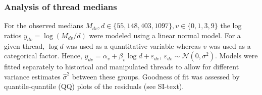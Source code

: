 \documentclass[9pt,a4paper,twocolumn,lineno]{article}
\begin{document}
\subsubsection*{Analysis of thread medians} For the observed medians $M_{dv}, d\in \{55,148,403,1097\}, v \in \{0,1,3,9\}$ the log ratios $y_{dv} = \log (M_{dv}/d)$ were modeled using a linear normal model. For a given thread, $\log{d}$ was used as a quantitative variable whereas $v$ was used as a categorical factor. Hence, $y_{dv} = \alpha_v+\beta_v\log{d}+\varepsilon_{dv}$, $\varepsilon_{dv} \sim \mathcal{N}(0,\sigma^2)$. Models were fitted separately to historical and manipulated threads to allow for different variance estimates $\hat{\sigma}^2$ between these groups. Goodness of fit was assessed by quantile-quantile (QQ) plots of the residuals (see SI-text).
\end{document}
